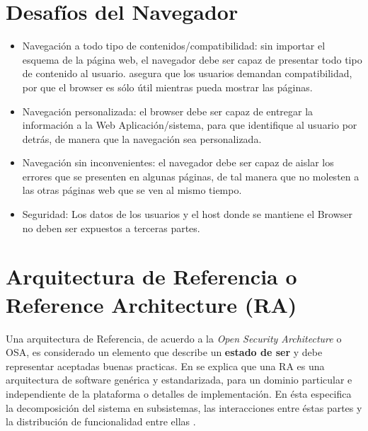 \section{Desafíos del Navegador}
    \label{chap2:Desafios}
    \begin{itemize}
        \item Navegación a todo tipo de contenidos/compatibilidad: sin importar el esquema de la página web, el navegador debe ser capaz de presentar todo tipo de contenido al usuario. \cite{barth2008security} asegura que los usuarios demandan compatibilidad, por que el browser es sólo útil mientras pueda mostrar las páginas.
        \item Navegación personalizada: el browser debe ser capaz de entregar la información a la Web Aplicación/sistema, para que identifique al usuario por detrás, de manera que la navegación sea personalizada.
        \item Navegación sin inconvenientes: el navegador debe ser capaz de aislar los errores que se presenten en algunas páginas, de tal manera que no molesten a las otras páginas web que se ven al mismo tiempo.
        \item Seguridad: Los datos de los usuarios y el host donde se mantiene el Browser no deben ser expuestos a terceras partes.
    \end{itemize}




\section{Arquitectura de Referencia o Reference Architecture (RA)}
\label{chap2:ArqRef}

Una arquitectura de Referencia, de acuerdo a la \textit{Open Security Architecture} o OSA\cite{openSecArch}, es considerado un elemento que describe un \textbf{estado de ser} y debe representar aceptadas buenas practicas. En \cite{Avgeriou2003} se explica que una RA es una arquitectura de software genérica y estandarizada, para un dominio particular e independiente de la plataforma o detalles de implementación. En ésta especifica la decomposición del sistema en subsistemas, las interacciones entre éstas partes y la distribución de funcionalidad entre ellas \cite{Bass2012}. 

